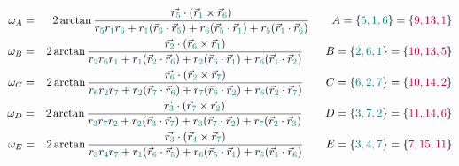 \begin{enumerate}
\begin{eqnarray}
\omega_A &=& 
2 \arctan \frac{\vec{r_{\color{teal}5}} \cdot (\vec{r}_{\color{teal}1} \times \vec{r}_{\color{teal}6})}
{{r}_{\color{teal}5}{r}_{\color{teal}1}{r}_{\color{teal}6} 
+{r}_{\color{teal}1}(\vec{r}_{\color{teal}6}\cdot\vec{r}_{\color{teal}5}) 
+{r}_{\color{teal}6}(\vec{r}_{\color{teal}5}\cdot\vec{r}_{\color{teal}1}) 
+{r}_{\color{teal}5}(\vec{r}_{\color{teal}1}\cdot\vec{r}_{\color{teal}6})  }  
\qquad A=\{{\color{teal}5,1,6}\}=\{ {\color{purple} 9,13,1} \}
\nn\\
\omega_B &=& 
2 \arctan \frac{\vec{r_{\color{teal}2}} \cdot (\vec{r}_{\color{teal}6} \times \vec{r}_{\color{teal}1})}
{{r}_{\color{teal}2}{r}_{\color{teal}6}{r}_{\color{teal}1} 
+{r}_{\color{teal}1}(\vec{r}_{\color{teal}2}\cdot\vec{r}_{\color{teal}6}) 
+{r}_{\color{teal}2}(\vec{r}_{\color{teal}6}\cdot\vec{r}_{\color{teal}1}) 
+{r}_{\color{teal}6}(\vec{r}_{\color{teal}1}\cdot\vec{r}_{\color{teal}2})  }  
\qquad B=\{ {\color{teal}2,6,1} \}=\{ {\color{purple} 10,13,5} \}
\nn\\
\omega_C &=& 
2 \arctan \frac{\vec{r_{\color{teal}6}} \cdot (\vec{r}_{\color{teal}2} \times \vec{r}_{\color{teal}7})}
{{r}_{\color{teal}6}{r}_{\color{teal}2}{r}_{\color{teal}7} 
+{r}_{\color{teal}2}(\vec{r}_{\color{teal}7}\cdot\vec{r}_{\color{teal}6}) 
+{r}_{\color{teal}7}(\vec{r}_{\color{teal}6}\cdot\vec{r}_{\color{teal}2}) 
+{r}_{\color{teal}6}(\vec{r}_{\color{teal}2}\cdot\vec{r}_{\color{teal}7})  }  
\qquad C=\{ {\color{teal}6,2,7} \}=\{ {\color{purple} 10,14,2} \}
\nn\\
\omega_D &=& 
2 \arctan \frac{\vec{r_{\color{teal}3}} \cdot (\vec{r}_{\color{teal}7} \times \vec{r}_{\color{teal}2})}
{{r}_{\color{teal}3}{r}_{\color{teal}7}{r}_{\color{teal}2} 
+{r}_{\color{teal}2}(\vec{r}_{\color{teal}3}\cdot\vec{r}_{\color{teal}7}) 
+{r}_{\color{teal}3}(\vec{r}_{\color{teal}7}\cdot\vec{r}_{\color{teal}2}) 
+{r}_{\color{teal}7}(\vec{r}_{\color{teal}2}\cdot\vec{r}_{\color{teal}3})  }  
\qquad D=\{ {\color{teal}3,7,2} \}=\{ {\color{purple} 11,14,6} \}
\nn\\
\omega_E &=& 
2 \arctan \frac{\vec{r_{\color{teal}3}} \cdot (\vec{r}_{\color{teal}4} \times \vec{r}_{\color{teal}7})}
{{r}_{\color{teal}3}{r}_{\color{teal}4}{r}_{\color{teal}7} 
+{r}_{\color{teal}1}(\vec{r}_{\color{teal}6}\cdot\vec{r}_{\color{teal}5}) 
+{r}_{\color{teal}6}(\vec{r}_{\color{teal}5}\cdot\vec{r}_{\color{teal}1}) 
+{r}_{\color{teal}5}(\vec{r}_{\color{teal}1}\cdot\vec{r}_{\color{teal}6})  }  
\qquad E=\{ {\color{teal} 3,4,7} \}=\{ {\color{purple} 7,15,11} \}

\end{eqnarray}
\end{enumerate}
